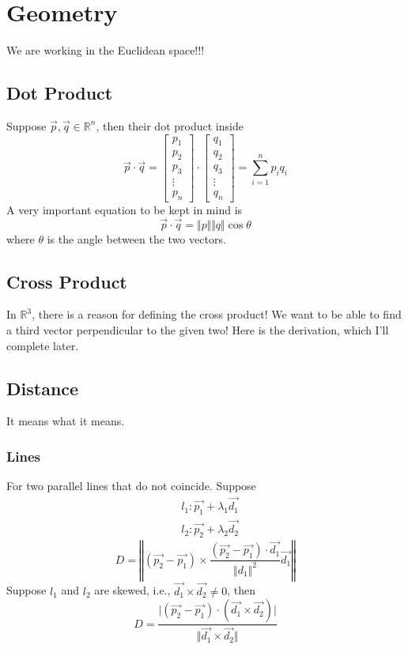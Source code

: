 \documentclass{article}
\theoremstyle{definition}
\theoremstyle{definition}
\theoremstyle{definition}
\theoremstyle{definition}
\theoremstyle{definition}
\theoremstyle{definition}
\theoremstyle{definition}
\theoremstyle{definition}
\theoremstyle{definition}
\newcommand{\RR}{\mathbb{R}}
\begin{document}
\section{Geometry}
We are working in the Euclidean space!!!
\subsection{Dot Product}
Suppose $\vec{p},\vec{q}\in\RR^n$, then their dot product inside
\[
\vec{p}\cdot\vec{q}=\begin{bmatrix}
    p_1\\p_2\\p_3\\ \vdots\\p_n
\end{bmatrix}\cdot\begin{bmatrix}
    q_1\\q_2\\q_3\\ \vdots\\q_n
\end{bmatrix}  
=\sum_{i=1}^n p_iq_i 
\]
A very important equation to be kept in mind is 
\[\vec{p}\cdot\vec{q}=\Vert p\Vert\Vert q\Vert\cos\theta\]
where $\theta$ is the angle between the two vectors.
\subsection{Cross Product}
In $\RR^3$, there is a reason for defining the cross product! We want to be able to find a third vector perpendicular to the given two! Here is the derivation, which I'll complete later.
\subsection{Distance}
It means what it means.
\subsubsection{Lines}
For two parallel lines that do not coincide. Suppose 
\begin{align*}
    &l_1:\vec{p_1}+\lambda_1\vec{d_1}\\
    &l_2:\vec{p_2}+\lambda_2\vec{d_2}
\end{align*}
\[
D=\left\Vert(\vec{p_2}-\vec{p_1})\times \dfrac{(\vec{p_2}-\vec{p_1})\cdot \vec{d_1}}{\Vert d_1\Vert^2}\vec{d_1}\right\Vert   
\]
Suppose $l_1$ and $l_2$ are skewed, i.e., $\vec{d_1}\times\vec{d_2}\neq 0$, then
\[
D=\dfrac{\vert(\vec{p_2}-\vec{p_1})\cdot(\vec{d_1}\times\vec{d_2})\vert}{\Vert\vec{d_1}\times\vec{d_2}\Vert}    
\]
\end{document}
